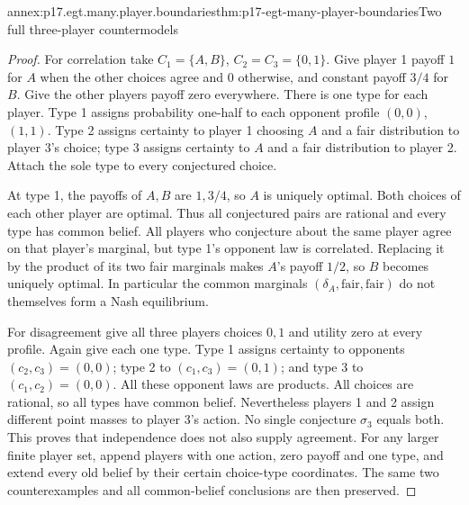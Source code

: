 \begin{annexitem}{annex:p17.egt.many.player.boundaries}{thm:p17-egt-many-player-boundaries}{Two full three-player countermodels}
\begin{proof}
For correlation take \(C_1=\{A,B\}\), \(C_2=C_3=\{0,1\}\).
Give player 1 payoff \(1\) for \(A\) when the other choices
agree and \(0\) otherwise, and constant payoff \(3/4\) for \(B\).
Give the other players payoff zero everywhere.
There is one type for each player. Type 1 assigns probability
one-half to each opponent profile \((0,0)\), \((1,1)\).
Type 2 assigns certainty to player 1 choosing \(A\) and
a fair distribution to player 3's choice; type 3 assigns
certainty to \(A\) and a fair distribution to player 2.
Attach the sole type to every conjectured choice.

At type 1, the payoffs of \(A,B\) are \(1,3/4\), so \(A\)
is uniquely optimal. Both choices of each other player are
optimal. Thus all conjectured pairs are rational and every
type has common belief. All players who conjecture about
the same player agree on that player's marginal, but type 1's
opponent law is correlated. Replacing it by the product of
its two fair marginals makes \(A\)'s payoff \(1/2\), so \(B\)
becomes uniquely optimal. In particular the common marginals
\((\delta_A,\mathrm{fair},\mathrm{fair})\) do not themselves
form a Nash equilibrium.

For disagreement give all three players choices \(0,1\)
and utility zero at every profile. Again give each one type.
Type 1 assigns certainty to opponents \((c_2,c_3)=(0,0)\);
type 2 to \((c_1,c_3)=(0,1)\); and type 3 to
\((c_1,c_2)=(0,0)\). All these opponent laws are products.
All choices are rational, so all types have common belief.
Nevertheless players 1 and 2 assign different point masses
to player 3's action. No single conjecture \(\sigma_3\)
equals both. This proves that independence does not also
supply agreement.
For any larger finite player set, append players with one action,
zero payoff and one type, and extend every old belief by their
certain choice-type coordinates. The same two counterexamples
and all common-belief conclusions are then preserved.
\end{proof}
\end{annexitem}

